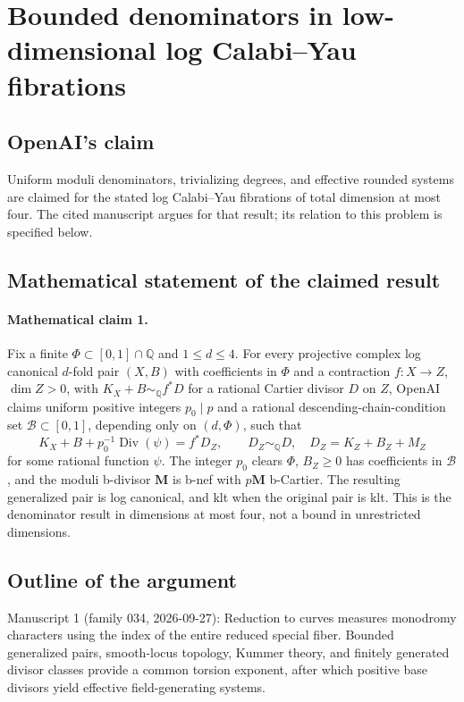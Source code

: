 \documentclass[11pt]{article}
\begin{document}
\section*{Bounded denominators in low-dimensional log Calabi–Yau fibrations}

\subsection{OpenAI's claim}
Uniform moduli denominators, trivializing degrees, and effective rounded systems are claimed for the stated log Calabi--Yau fibrations of total dimension at most four. The cited manuscript argues for that result; its relation to this problem is specified below.

\subsection{Mathematical statement of the claimed result}
\paragraph{Mathematical claim 1.} Fix a finite $\Phi\subset[0,1]\cap\mathbb Q$ and $1\le d\le4$. For every projective complex log canonical $d$-fold pair $(X,B)$ with coefficients in $\Phi$ and a contraction $f:X\to Z$, $\dim Z>0$, with $K_X+B\sim_{\mathbb Q}f^*D$ for a rational Cartier divisor $D$ on $Z$, OpenAI claims uniform positive integers $p_0\mid p$ and a rational descending-chain-condition set $\mathcal B\subset[0,1]$, depending only on $(d,\Phi)$, such that
\[
K_X+B+p_0^{-1}\operatorname{Div}(\psi)=f^*D_Z,\qquad
D_Z\sim_{\mathbb Q}D,\quad D_Z=K_Z+B_Z+M_Z
\]
for some rational function $\psi$. The integer $p_0$ clears $\Phi$, $B_Z\ge0$ has coefficients in $\mathcal B$, and the moduli b-divisor $\mathbf M$ is b-nef with $p\mathbf M$ b-Cartier. The resulting generalized pair is log canonical, and klt when the original pair is klt. This is the denominator result in dimensions at most four, not a bound in unrestricted dimensions.

\subsection{Outline of the argument}
Manuscript 1 (family 034, 2026-09-27): Reduction to curves measures monodromy characters using the index of the entire reduced special fiber. Bounded generalized pairs, smooth-locus topology, Kummer theory, and finitely generated divisor classes provide a common torsion exponent, after which positive base divisors yield effective field-generating systems.
\end{document}
